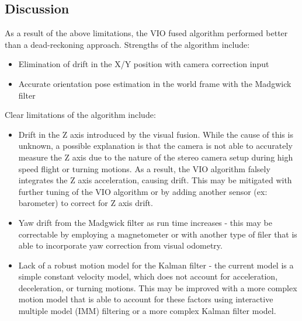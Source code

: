 \documentclass[bare_jrnl_transmag]{subfiles}
\begin{document}
\subsection{Discussion}
As a result of the above limitations, the VIO fused algorithm performed better than a dead-reckoning approach. Strengths of the algorithm include:
\begin{itemize}
    \item Elimination of drift in the X/Y position with camera correction input
    \item Accurate orientation pose estimation in the world frame with the Madgwick filter 
\end{itemize}

Clear limitations of the algorithm include:
\begin{itemize}
    \item Drift in the Z axis introduced by the visual fusion. While the cause of this is unknown, a possible explanation is that the camera is not able to accurately measure the Z axis due to the nature of the stereo camera setup during high speed flight or turning motions. As a result, the VIO algorithm falsely integrates the Z axis acceleration, causing drift. This may be mitigated with further tuning of the VIO algorithm or by adding another sensor (ex: barometer) to correct for Z axis drift.
    \item Yaw drift from the Madgwick filter as run time increases - this may be correctable by employing a magnetometer or with another type of filer that is able to incorporate yaw correction from visual odometry. 
    \item Lack of a robust motion model for the Kalman filter - the current model is a simple constant velocity model, which does not account for acceleration, deceleration, or turning motions. This may be improved with a more complex motion model that is able to account for these factors using interactive multiple model (IMM) filtering or a more complex Kalman filter model.
\end{itemize}
\end{document}
